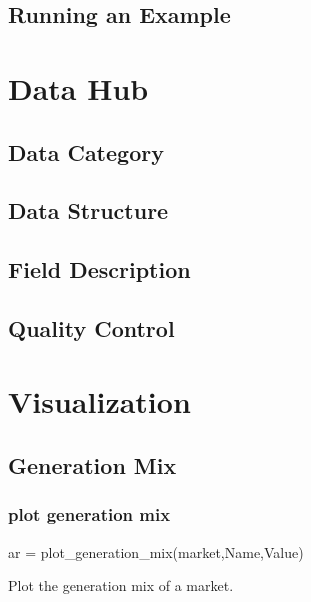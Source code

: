 \documentclass[11pt]{article}
\numberwithin{equation}{section}
\numberwithin{table}{section}
\numberwithin{figure}{section}
\begin{document}
\subsection{Running an Example}





\newpage
\section{Data Hub} \label{sec:datahub}

\subsection{Data Category}

\subsection{Data Structure}

\subsection{Field Description}

\subsection{Quality Control}








\newpage
\section{Visualization} \label{sec:visual}

\subsection{Generation Mix}
\subsubsection{plot generation mix}
\begin{Code}
  ar = plot_generation_mix(market,Name,Value)
\end{Code}

Plot the generation mix of a market.
\end{document}
